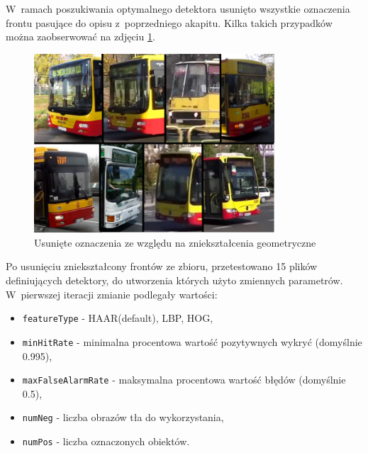 W~ramach poszukiwania optymalnego detektora
usunięto wszystkie oznaczenia frontu pasujące do opisu
z~poprzedniego akapitu. Kilka takich przypadków można
zaobserwować na zdjęciu \ref{fig:deformation_samples}.

\begin{figure}[h!]
    \centering
    \includegraphics[width=0.8\textwidth]{img/exp_removed_distorted_fronts}
    \caption{Usunięte oznaczenia ze względu na zniekształcenia geometryczne}
    \label{fig:deformation_samples}
\end{figure}

Po usunięciu zniekształcony frontów ze zbioru, przetestowano
15 plików definiujących detektory, do utworzenia
których użyto zmiennych parametrów. W~pierwszej iteracji zmianie podlegały
wartości:

\begin{itemize}
\item \verb|featureType| - HAAR(default), LBP, HOG,
\item \verb|minHitRate| - minimalna procentowa wartość pozytywnych wykryć (domyślnie 0.995),
\item \verb|maxFalseAlarmRate| - maksymalna procentowa wartość błędów (domyślnie 0.5),
\item \verb|numNeg| - liczba obrazów tła do wykorzystania,
\item \verb|numPos| - liczba oznaczonych obiektów.
\end{itemize}

